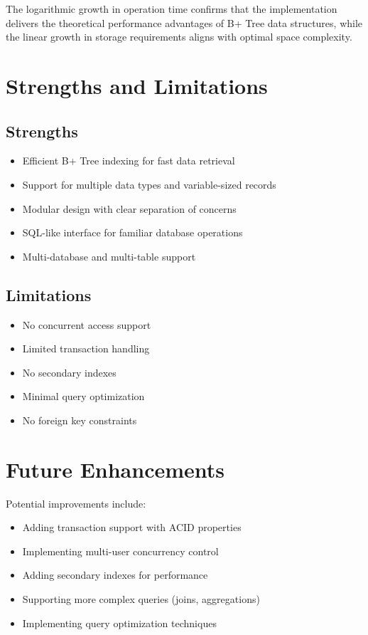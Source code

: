 \documentclass[12pt,a4paper]{article}  %
\begin{document}
The logarithmic growth in operation time confirms that the implementation delivers the theoretical performance advantages of B+ Tree data structures, while the linear growth in storage requirements aligns with optimal space complexity.

\section{Strengths and Limitations}

\subsection{Strengths}
\begin{itemize}
    \item Efficient B+ Tree indexing for fast data retrieval
    \item Support for multiple data types and variable-sized records
    \item Modular design with clear separation of concerns
    \item SQL-like interface for familiar database operations
    \item Multi-database and multi-table support
\end{itemize}

\subsection{Limitations}
\begin{itemize}
    \item No concurrent access support
    \item Limited transaction handling
    \item No secondary indexes
    \item Minimal query optimization
    \item No foreign key constraints
\end{itemize}

\section{Future Enhancements}

Potential improvements include:

\begin{itemize}
    \item Adding transaction support with ACID properties
    \item Implementing multi-user concurrency control
    \item Adding secondary indexes for performance
    \item Supporting more complex queries (joins, aggregations)
    \item Implementing query optimization techniques
\end{itemize}
\end{document}
